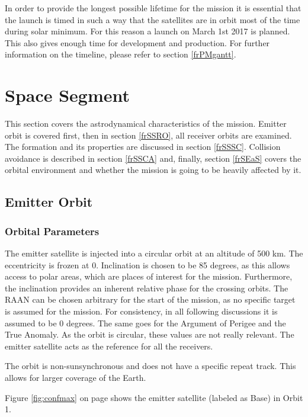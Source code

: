 In order to provide the longest possible lifetime for the mission it is essential that the launch is timed in such a way that the satellites are in orbit most of the time during solar minimum. For this reason a launch on March 1st 2017 is planned. This also gives enough time for development and production. For further information on the timeline, please refer to section \ref{frPMgantt}.

\section{Space Segment}
\label{frSS}

This section covers the astrodynamical characteristics of the mission. Emitter orbit is covered first, then in section \ref{frSSRO}, all receiver orbits are examined. The formation and its properties are discussed in section \ref{frSSSC}. Collision avoidance is described in section \ref{frSSCA} and, finally, section \ref{frSEaS} covers the orbital environment and whether the mission is going to be heavily affected by it. 

\subsection{Emitter Orbit}
\label{frSSEOD}

\subsubsection{Orbital Parameters}
\label{frSSEODOP}

The emitter satellite is injected into a circular orbit at an altitude of 500 km. The eccentricity is frozen at 0. Inclination is chosen to be 85 degrees, as this allows access to polar areas, which are places of interest for the mission. Furthermore, the inclination provides an inherent relative phase for the crossing orbits. The \acl{RAAN} can be chosen arbitrary for the start of the mission, as no specific target is assumed for the mission. For consistency, in all following discussions it is assumed to be 0 degrees. The same goes for the Argument of Perigee and the True Anomaly. As the orbit is circular, these values are not really relevant. The emitter satellite acts as the reference for all the receivers.

The orbit is non-sunsynchronous and does not have a specific repeat track. This allows for larger coverage of the Earth. 

Figure \ref{fig:confmax} on page \pageref{fig:confmax} shows the emitter satellite (labeled as Base) in Orbit 1.

